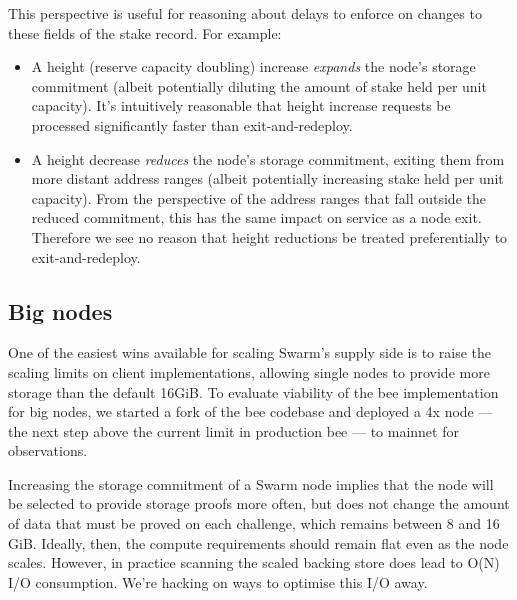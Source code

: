 This perspective is useful for reasoning about delays to enforce on changes to these fields of the stake record.
%
For example:
%
\begin{itemize}
  \item A height (reserve capacity doubling) increase \emph{expands} the node's storage commitment (albeit potentially diluting the amount of stake held per unit capacity).
    It's intuitively reasonable that height increase requests be processed significantly faster than exit-and-redeploy.

  \item A height decrease \emph{reduces} the node's storage commitment, exiting them from more distant address ranges (albeit potentially increasing stake held per unit capacity).
    From the perspective of the address ranges that fall outside the reduced commitment, this has the same impact on service as a node exit.
    Therefore we see no reason that height reductions be treated preferentially to exit-and-redeploy.
\end{itemize}

\subsection*{Big nodes}
%
One of the easiest wins available for scaling Swarm's supply side is to raise the scaling limits on client implementations, allowing single nodes to provide more storage than the default 16GiB.
%
To evaluate viability of the bee implementation for big nodes, we started a fork of the bee codebase and deployed a 4x node — the next step above the current limit in production bee — to mainnet for observations.

Increasing the storage commitment of a Swarm node implies that the node will be selected to provide storage proofs more often, but does not change the amount of data that must be proved on each challenge, which remains between 8 and 16 GiB.
%
Ideally, then, the compute requirements should remain flat even as the node scales. 
%
However, in practice scanning the scaled backing store does lead to O(N) I/O consumption.
%
We're hacking on ways to optimise this I/O away. 